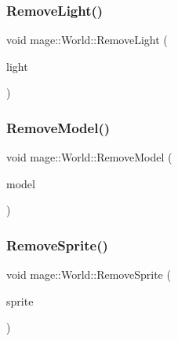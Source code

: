 \subsubsection{\texorpdfstring{Remove\+Light()}{RemoveLight()}}
{\footnotesize\ttfamily void mage\+::\+World\+::\+Remove\+Light (\begin{DoxyParamCaption}\item[{\hyperlink{namespacemage_a1e01ae66713838a7a67d30e44c67703e}{Shared\+Ptr}$<$ \hyperlink{classmage_1_1_light}{Light} $>$}]{light }\end{DoxyParamCaption})}

\hypertarget{classmage_1_1_world_afad0c7024fcd304bb582bdc1d281c590}{}\label{classmage_1_1_world_afad0c7024fcd304bb582bdc1d281c590} 
\subsubsection{\texorpdfstring{Remove\+Model()}{RemoveModel()}}
{\footnotesize\ttfamily void mage\+::\+World\+::\+Remove\+Model (\begin{DoxyParamCaption}\item[{\hyperlink{namespacemage_a1e01ae66713838a7a67d30e44c67703e}{Shared\+Ptr}$<$ \hyperlink{classmage_1_1_model}{Model} $>$}]{model }\end{DoxyParamCaption})}

\hypertarget{classmage_1_1_world_a78bb790257c3a03ccb6829859230b4c7}{}\label{classmage_1_1_world_a78bb790257c3a03ccb6829859230b4c7} 
\subsubsection{\texorpdfstring{Remove\+Sprite()}{RemoveSprite()}}
{\footnotesize\ttfamily void mage\+::\+World\+::\+Remove\+Sprite (\begin{DoxyParamCaption}\item[{\hyperlink{namespacemage_a1e01ae66713838a7a67d30e44c67703e}{Shared\+Ptr}$<$ \hyperlink{classmage_1_1_sprite_object}{Sprite\+Object} $>$}]{sprite }\end{DoxyParamCaption})}

\hypertarget{classmage_1_1_world_a49e7adf01a415aefc911d69c6fcee665}{}\label{classmage_1_1_world_a49e7adf01a415aefc911d69c6fcee665} 
